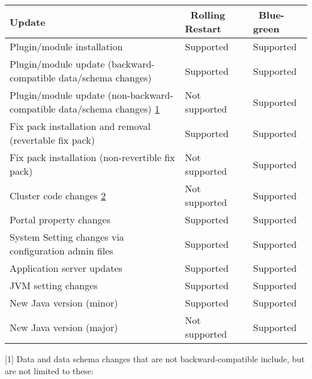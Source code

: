 \begin{longtable}[]{@{}
  >{\raggedright\arraybackslash}p{}
  >{\raggedright\arraybackslash}p{}
  >{\raggedright\arraybackslash}p{}@{}}
\toprule\noalign{}
\begin{minipage}[b]{\linewidth}\raggedright
Update
\end{minipage} & \begin{minipage}[b]{\linewidth}\raggedright
~Rolling Restart
\end{minipage} & \begin{minipage}[b]{\linewidth}\raggedright
~Blue-green
\end{minipage} \\
\midrule\noalign{}
\endhead
\bottomrule\noalign{}
\endlastfoot
Plugin/module installation & Supported & Supported \\
Plugin/module update (backward-compatible data/schema changes) &
Supported & Supported \\
Plugin/module update (non-backward-compatible data/schema changes)
\hyperref[one]{1} & Not supported & Supported \\
Fix pack installation and removal (revertable fix pack) & Supported &
Supported \\
Fix pack installation (non-revertible fix pack) & Not supported &
Supported \\
Cluster code changes \hyperref[two]{2} & Not supported & Supported \\
Portal property changes & Supported & Supported \\
System Setting changes via configuration admin files & Supported &
Supported \\
Application server updates & Supported & Supported \\
JVM setting changes & Supported & Supported \\
New Java version (minor) & Supported & Supported \\
New Java version (major) & Not supported & Supported \\
\end{longtable}

\noindent\hrulefill

{[}1{]} Data and data schema changes that are not backward-compatible
include, but are not limited to these:

